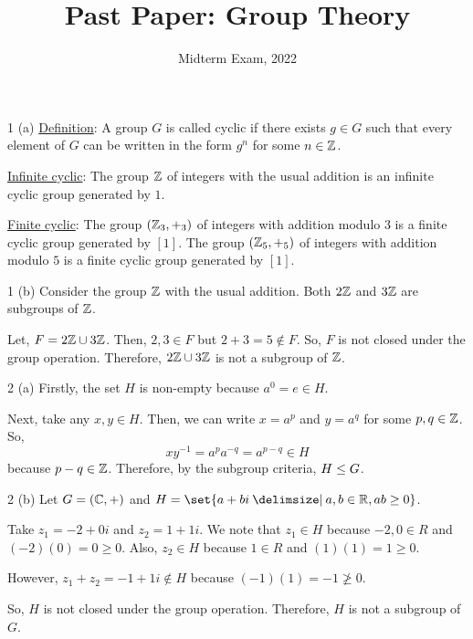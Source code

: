 \documentclass[11pt]{penrose}
\title{Past Paper: Group Theory}
\subtitle{Midterm Exam, 2022}
\begin{document}
\maketitle
\warningtext

\begin{problem}{1 (a)}
    \underline{Definition}: A group $G$ is called cyclic if there exists $g \in G$ such that every element of $G$ can be written in the form $g^n$ for some $n \in \mathbb{Z}$.

    \underline{Infinite cyclic}: The group $\mathbb{Z}$ of integers with the usual addition is an infinite cyclic group generated by $1$.
    
    \underline{Finite cyclic}: The group $(\mathbb{Z}_3, +_3)$ of integers with addition modulo $3$ is a finite cyclic group generated by $[1]$. The group $(\mathbb{Z}_5, +_5)$ of integers with addition modulo $5$ is a finite cyclic group generated by $[1]$.
\end{problem}

\begin{problem}{1 (b)}
    Consider the group $\mathbb{Z}$ with the usual addition. Both $2\mathbb{Z}$ and $3\mathbb{Z}$ are subgroups of $\mathbb{Z}$. 

    Let, $F = 2\mathbb{Z} \cup 3\mathbb{Z}$. Then, $2, 3 \in F$ but $2+3 = 5 \notin F$. So, $F$ is not closed under the group operation. Therefore, $2\mathbb{Z} \cup 3\mathbb{Z}$ is not a subgroup of $\mathbb{Z}$.
\end{problem}

\begin{problem}{2 (a)}
    Firstly, the set $H$ is non-empty because $a^0 = e \in H$.

    Next, take any $x, y \in H$. Then, we can write $x = a^p$ and $y = a^q$ for some $p, q \in \mathbb{Z}$. So,
    \begin{equation*}
        x y^{-1} = a^p a^{-q} = a^{p-q} \in H
    \end{equation*}
    because $p-q \in \mathbb{Z}$. Therefore, by the subgroup criteria, $H \mathrel{\leq} G$.
\end{problem}

\begin{problem}{2 (b)}
    Let $G = (\mathbb{C}, +)$ and $H = \set{a+bi \st a,b \in \R, ab \geq 0}$.

    Take $z_1 = -2 + 0i$ and $z_2 = 1 + 1i$. We note that $z_1 \in H$ because $-2, 0 \in R$ and $(-2)(0) = 0 \geq 0$. Also, $z_2 \in H$ because $1 \in R$ and $(1)(1) = 1 \geq 0$.

    However, $z_1 + z_2 = -1 + 1i \notin H$ because $(-1)(1) = -1 \ngeq 0$.

    So, $H$ is not closed under the group operation. Therefore, $H$ is not a subgroup of $G$.
\end{problem}
\end{document}
